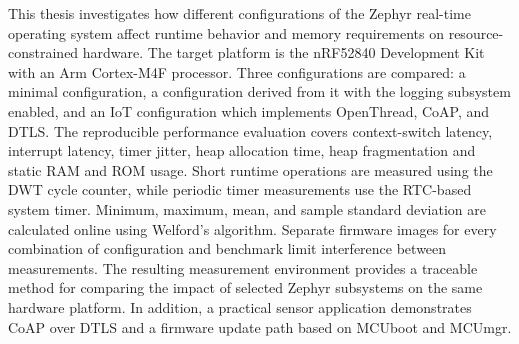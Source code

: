 \begin{extraAbstract}[\null]
	This thesis investigates how different configurations of the Zephyr real-time operating system affect runtime behavior and memory requirements on resource-constrained hardware. The target platform is the nRF52840 Development Kit with an Arm Cortex-M4F processor. Three configurations are compared: a minimal configuration, a configuration derived from it with the logging subsystem enabled, and an IoT configuration which implements OpenThread, CoAP, and DTLS. The reproducible performance evaluation covers context-switch latency, interrupt latency, timer jitter, heap allocation time, heap fragmentation and static RAM and ROM usage. Short runtime operations are measured using the DWT cycle counter, while periodic timer measurements use the RTC-based system timer. Minimum, maximum, mean, and sample standard deviation are calculated online using Welford's algorithm. Separate firmware images for every combination of configuration and benchmark limit interference between measurements. The resulting measurement environment provides a traceable method for comparing the impact of selected Zephyr subsystems on the same hardware platform. In addition, a practical sensor application demonstrates CoAP over DTLS and a firmware update path based on MCUboot and MCUmgr.
\end{extraAbstract}




\tableofcontents %

\listoffigures %



